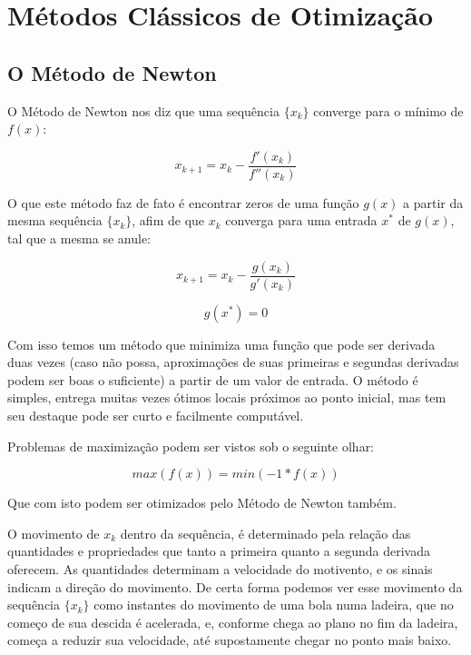 

\chapter{\Large{Métodos Clássicos de Otimização}}\label{chp:2}


\section{{O Método de Newton}}

\hspace{0.8cm}

O Método de Newton nos diz que uma sequência \(\{x_k\}\) converge para o mínimo
de \(f(x)\):

\begin{equation}
    x_{k+1} = x_{k} - \frac {f'(x_{k})}{f''(x_{k})}
\end{equation}

O que este método faz de fato é encontrar zeros de uma função \(g(x)\) a partir
da mesma sequência \(\{x_k\}\), afim de que \(x_k\) converga para uma entrada
\(x^*\) de \(g(x)\), tal que a mesma se anule:

\begin{equation}
    x_{k+1} = x_{k} - \frac {g(x_{k})}{g'(x_{k})}
\end{equation}

\begin{equation}
    g(x^*) = 0
\end{equation}


Com isso temos um método que minimiza uma função que pode ser derivada duas
vezes (caso não possa, aproximações de suas primeiras e segundas derivadas
podem ser boas o suficiente) a partir de um valor de entrada. O método é
simples, entrega muitas vezes ótimos locais próximos ao ponto inicial, mas tem
seu destaque pode ser curto e facilmente computável.

Problemas de maximização podem ser vistos sob o seguinte olhar:

\begin{equation}
    max(f(x)) = min(-1 * f(x))
\end{equation}

Que com isto podem ser otimizados pelo Método de Newton também.

O movimento de \(x_k\) dentro da sequência, é determinado pela relação das
quantidades e propriedades que tanto a primeira quanto a segunda derivada
oferecem. As quantidades determinam a velocidade do motivento, e os sinais
indicam a direção do movimento. De certa forma podemos ver esse movimento da
sequência \(\{x_k\}\) como instantes do movimento de uma bola numa ladeira, que
no começo de sua descida é acelerada, e, conforme chega ao plano no fim da
ladeira, começa a reduzir sua velocidade, até supostamente chegar no ponto mais
baixo.


